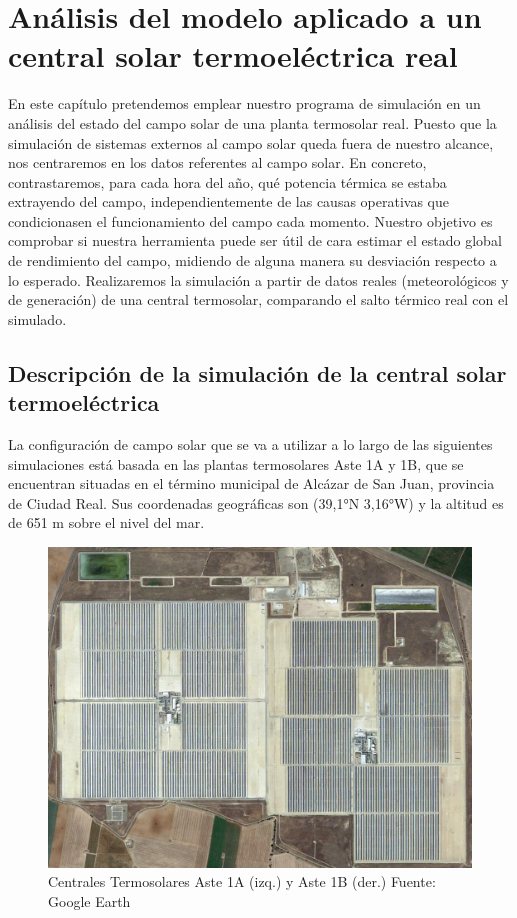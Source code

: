 \chapter{Análisis del modelo aplicado a un central solar termoeléctrica real}
\label{analisis-central}

En este capítulo pretendemos emplear nuestro programa de simulación en un análisis del estado del campo solar de una planta termosolar real. Puesto que la simulación de sistemas externos al campo solar queda fuera de nuestro alcance, nos centraremos en los datos referentes al campo solar. En concreto, contrastaremos, para cada  hora del año, qué potencia térmica se estaba extrayendo del campo, independientemente de las causas operativas que condicionasen el funcionamiento del campo cada momento. Nuestro objetivo es comprobar si nuestra herramienta puede ser útil de cara estimar el estado global de rendimiento del campo, midiendo de alguna manera su desviación respecto a lo esperado. Realizaremos la simulación a partir de datos reales (meteorológicos y de generación) de una central termosolar, comparando el salto térmico real con el simulado. 

\section{Descripción de la simulación de la central solar termoeléctrica}
\label{descripcion-central}

La configuración de campo solar que se va a utilizar a lo largo de las siguientes simulaciones está basada en las plantas termosolares Aste 1A y 1B, que se encuentran situadas en el término municipal de Alcázar de San Juan, provincia de Ciudad Real. Sus coordenadas geográficas son (39,1°N 3,16°W) y la altitud es de 651 m sobre el nivel del mar.

\begin{figure}
\includegraphics[width=0.9\linewidth]{images/fotoAstes.png}
\caption{Centrales Termosolares Aste 1A (izq.) y Aste 1B (der.) Fuente: Google Earth} 
\label{fig:astes}
\end{figure}

